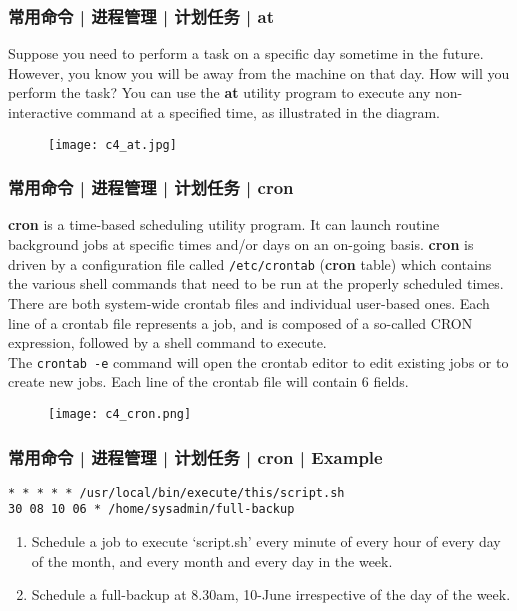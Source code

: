 \begin{frame}
  \frametitle{常用命令 | 进程管理 | 计划任务 | at}
  Suppose you need to perform a task on a specific day sometime in the future. However, you know you will be away from the machine on that day. How will you perform the task? You can use the \textbf{at} utility program to execute any non-interactive command at a specified time, as illustrated in the diagram.
  \begin{figure}
    \centering
    \texttt{[image: c4\_at.jpg]}
  \end{figure}
\end{frame}

\begin{frame}[fragile]
  \frametitle{常用命令 | 进程管理 | 计划任务 | cron}
  {\footnotesize
  \textbf{cron} is a time-based scheduling utility program. It can launch routine background jobs at specific times and/or days on an on-going basis.  \textbf{cron} is driven by a configuration file called \verb|/etc/crontab| (\textbf{cron} table) which contains the various shell commands that need to be run at the properly scheduled times. There are both system-wide crontab files and individual user-based ones. Each line of a crontab file represents a job, and is composed of a so-called CRON expression, followed by a shell command to execute.\\
  The \verb|crontab -e| command will open the crontab editor to edit existing jobs or to create new jobs. Each line of the crontab file will contain 6 fields.\\
  }
  \vspace{-0.2cm}
  \begin{figure}
    \centering
    \texttt{[image: c4\_cron.png]}
  \end{figure}
\end{frame}

\begin{frame}[fragile]
  \frametitle{常用命令 | 进程管理 | 计划任务 | cron | Example}
\begin{lstlisting}
* * * * * /usr/local/bin/execute/this/script.sh
30 08 10 06 * /home/sysadmin/full-backup
\end{lstlisting}
\pause
\begin{enumerate}
  \item Schedule a job to execute `script.sh' every minute of every hour of every day of the month, and every month and every day in the week.
  \item Schedule a full-backup at 8.30am, 10-June irrespective of the day of the week.
\end{enumerate}
\end{frame}

